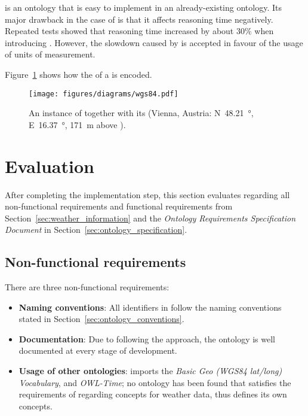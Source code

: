 \muo is an ontology that is easy to implement in an already-existing ontology. Its major drawback in the case of \smarthomeweather is that it affects reasoning time negatively. Repeated tests showed that reasoning time increased by about $30 \%$ when introducing \muo. However, the slowdown caused by \muo is accepted in favour of the usage of units of measurement.

\vspace{1em}

Figure~\ref{fig:owl_wgs84} shows how the  of a  is encoded. %

\begin{figure}
  \centering
  \texttt{[image: figures/diagrams/wgs84.pdf]}
  \caption{An instance of  together with its  (Vienna, Austria: N~\SI{48.21}{\degree}, E~\SI{16.37}{\degree}, \SI{171}{\metre} above ).}
  \label{fig:owl_wgs84}
\end{figure}

\section{Evaluation}
\label{sec:ontology_evaluation}

After completing the implementation step, this section evaluates \smarthomeweather regarding all non-functional requirements and functional requirements from Section~\ref{sec:weather_information} and the \emph{Ontology Requirements Specification Document} in Section~\ref{sec:ontology_specification}.

\subsection{Non-functional requirements}
\label{sec:evaluation_non_functional}

There are three non-functional requirements:

\begin{itemize}
  \item \textbf{Naming conventions}: All identifiers in \smarthomeweather follow the naming conventions stated in Section~\ref{sec:ontology_conventions}.
  \item \textbf{Documentation}: Due to following the \methontology approach, the ontology is well documented at every stage of development.
  \item \textbf{Usage of other ontologies}: \smarthomeweather imports the \emph{Basic Geo (WGS84 lat/long) Vocabulary}, \muo and \emph{OWL-Time}; no ontology has been found that satisfies the requirements of \smarthomeweather regarding concepts for weather data, thus \smarthomeweather defines its own concepts.
\end{itemize}


